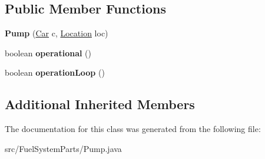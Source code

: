 \subsection*{Public Member Functions}
\begin{DoxyCompactItemize}
\item 
\hypertarget{classFuelSystemParts_1_1Pump_af1319ff7e9f54845a6374dc4e20602b6}{}{\bfseries Pump} (\hyperlink{classCars_1_1Car}{Car} c, \hyperlink{enumEnums_1_1Location}{Location} loc)\label{classFuelSystemParts_1_1Pump_af1319ff7e9f54845a6374dc4e20602b6}

\item 
\hypertarget{classFuelSystemParts_1_1Pump_ab3f399f2a7862a88633002767d0976f1}{}boolean {\bfseries operational} ()\label{classFuelSystemParts_1_1Pump_ab3f399f2a7862a88633002767d0976f1}

\item 
\hypertarget{classFuelSystemParts_1_1Pump_a77442687a2297befe7badb11d09a7caf}{}boolean {\bfseries operation\+Loop} ()\label{classFuelSystemParts_1_1Pump_a77442687a2297befe7badb11d09a7caf}

\end{DoxyCompactItemize}
\subsection*{Additional Inherited Members}


The documentation for this class was generated from the following file\+:\begin{DoxyCompactItemize}
\item 
src/\+Fuel\+System\+Parts/Pump.\+java\end{DoxyCompactItemize}
